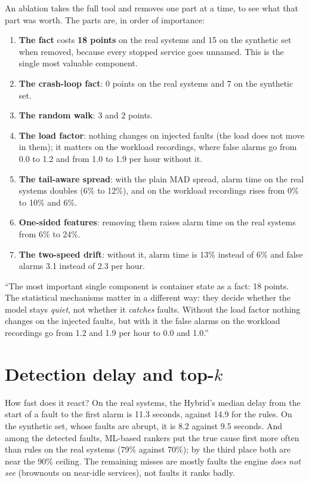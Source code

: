 \begin{simplebox}
An ablation takes the full tool and removes one part at a time, to see what that part was worth. The parts are, in order of importance:
\begin{enumerate}
\item \textbf{The  fact} costs \textbf{18 points} on the real systems and 15 on the synthetic set when removed, because every stopped service goes unnamed. This is the single most valuable component.
\item \textbf{The crash-loop fact}: 0 points on the real systems and 7 on the synthetic set.
\item \textbf{The random walk}: 3 and 2 points.
\item \textbf{The load factor}: nothing changes on injected faults (the load does not move in them); it matters on the workload recordings, where false alarms go from 0.0 to 1.2 and from 1.0 to 1.9 per hour without it.
\item \textbf{The tail-aware spread}: with the plain MAD spread, alarm time on the real systems doubles (6\% to 12\%), and on the workload recordings rises from 0\% to 10\% and 6\%.
\item \textbf{One-sided features}: removing them raises alarm time on the real systems from 6\% to 24\%.
\item \textbf{The two-speed drift}: without it, alarm time is 13\% instead of 6\% and false alarms 3.1 instead of 2.3 per hour.
\end{enumerate}
\end{simplebox}

\begin{saybox}
``The most important single component is container state as a fact: 18 points. The statistical mechanisms matter in a different way: they decide whether the model stays \emph{quiet}, not whether it \emph{catches} faults. Without the load factor nothing changes on the injected faults, but with it the false alarms on the workload recordings go from 1.2 and 1.9 per hour to 0.0 and 1.0.''
\end{saybox}

\section{Detection delay and top-$k$}
\begin{simplebox}
How fast does it react? On the real systems, the Hybrid's median delay from the start of a fault to the first alarm is 11.3 seconds, against 14.9 for the rules. On the synthetic set, whose faults are abrupt, it is 8.2 against 9.5 seconds. And among the detected faults, ML-based rankers put the true cause first more often than rules on the real systems (79\% against 70\%); by the third place both are near the 90\% ceiling. The remaining misses are mostly faults the engine \emph{does not see} (brownouts on near-idle services), not faults it ranks badly.
\end{simplebox}


